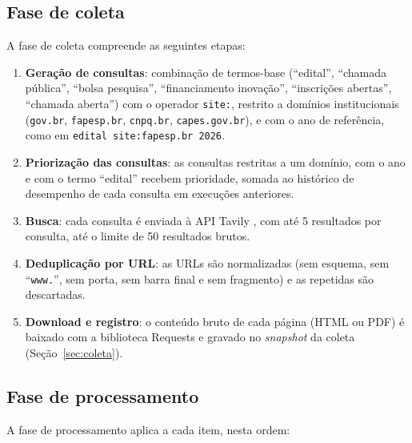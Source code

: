 \subsection{Fase de coleta}
\label{subsec:fase_coleta}

A fase de coleta compreende as seguintes etapas:

\begin{enumerate}
  \item \textbf{Geração de consultas}: combinação de termos-base (``edital'',
    ``chamada pública'', ``bolsa pesquisa'', ``financiamento inovação'',
    ``inscrições abertas'', ``chamada aberta'') com o operador \texttt{site:},
    restrito a domínios institucionais (\texttt{gov.br}, \texttt{fapesp.br},
    \texttt{cnpq.br}, \texttt{capes.gov.br}), e com o ano de referência, como
    em \texttt{edital site:fapesp.br 2026}.
  \item \textbf{Priorização das consultas}: as consultas restritas a um
    domínio, com o ano e com o termo ``edital'' recebem prioridade, somada ao
    histórico de desempenho de cada consulta em execuções anteriores.
  \item \textbf{Busca}: cada consulta é enviada à API Tavily \cite{tavily},
    com até 5 resultados por consulta, até o limite de 50 resultados brutos.
  \item \textbf{Deduplicação por URL}: as URLs são normalizadas (sem esquema,
    sem ``\texttt{www.}'', sem porta, sem barra final e sem fragmento) e as
    repetidas são descartadas.
  \item \textbf{Download e registro}: o conteúdo bruto de cada página (HTML ou
    PDF) é baixado com a biblioteca Requests \cite{requests} e gravado no
    \textit{snapshot} da coleta (Seção~\ref{sec:coleta}).
\end{enumerate}

\subsection{Fase de processamento}
\label{subsec:fase_processamento}

A fase de processamento aplica a cada item, nesta ordem:

